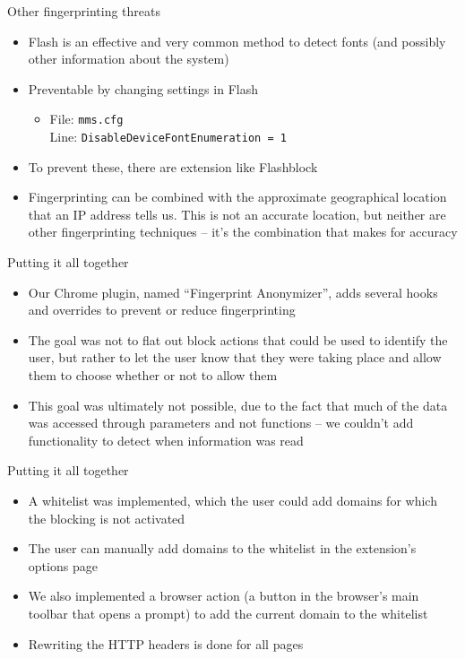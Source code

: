 \begin{frame}[fragile,t]{Other fingerprinting threats}
	\begin{itemize}
		\item Flash is an effective and very common method to detect fonts (and possibly other information about the system)
		\item Preventable by changing settings in Flash
		\begin{itemize}
			\item[] File: \texttt{mms.cfg} \\ Line: \texttt{DisableDeviceFontEnumeration = 1}
		\end{itemize}
		\item To prevent these, there are extension like Flashblock
		\item Fingerprinting can be combined with the approximate geographical location that an IP address tells us. This is not an accurate location, but neither are other fingerprinting techniques -- it's the combination that makes for accuracy
	\end{itemize}
\end{frame}

\begin{frame}[fragile,t]{Putting it all together}
	\begin{itemize}
		\item Our Chrome plugin, named ``Fingerprint Anonymizer'', adds several hooks and overrides to prevent or reduce fingerprinting
		\item The goal was not to flat out block actions that could be used to identify the user, but rather to let the user know that they were taking place and allow them to choose whether or not to allow them
		\item This goal was ultimately not possible, due to the fact that much of the data was accessed through parameters and not functions -- we couldn't add functionality to detect when information was read
	\end{itemize}
\end{frame}

\begin{frame}[fragile,t]{Putting it all together}
	\begin{itemize}
		\item A whitelist was implemented, which the user could add domains for which the blocking is not activated
		\item The user can manually add domains to the whitelist in the extension's options page
		\item We also implemented a browser action (a button in the browser's main toolbar that opens a prompt) to add the current domain to the whitelist
		\item Rewriting the HTTP headers is done for all pages
	\end{itemize}
\end{frame}

